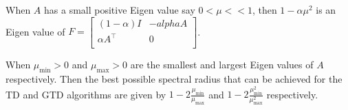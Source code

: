 \begin{lemma}\label{squared}
When $A$ has a small positive Eigen value say $0<\mu<<1$, then $1-\alpha\mu^2$ is an Eigen value of $F=\begin{bmatrix} (1-\alpha)I & -alpha A \\ \alpha A^\top& 0\\\end{bmatrix}$.
\end{lemma}
\begin{lemma}
When $\mu_{\min}>0$ and $\mu_{\max}>0$ are the smallest and largest Eigen values of $A$ respectively. Then the best possible spectral radius that can be achieved for the TD and GTD algorithms are given by $1-2\frac{\mu_{\min}}{\mu_{\max}}$ and $1-2\frac{\mu_{\min}^2}{\mu_{\max}^2}$ respectively.
\end{lemma}
